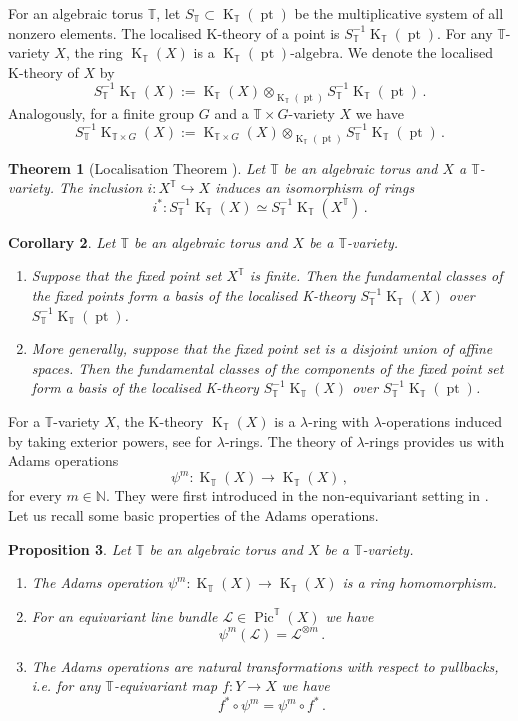 \documentclass[12pt,a4paper]{amsart}
\theoremstyle{plain}
\newtheorem{tw}{Theorem}[section]
\newtheorem{pro}[tw]{Proposition}
\newtheorem{cor}[tw]{Corollary}
\theoremstyle{definition}
\theoremstyle{remark}
\newcommand{\pt}{\operatorname{pt}}
\newcommand{\NN}{\mathbb{N}}
\newcommand{\TT}{\mathbb{T}}
\def\L{\mathcal{L}}
\newcommand{\mono}{\hookrightarrow}
\DeclareMathOperator{\KTh}{K}
\begin{document}
For an algebraic torus $\TT$, let $S_{\TT}\subset \KTh_{\TT}(\pt)$ be the multiplicative system of all nonzero elements. The localised K-theory of a point is $S^{-1}_{\TT}\KTh_{\TT}(\pt)$. For any $\TT$-variety $X$, the ring $\KTh_{\TT}(X)$ is a $\KTh_{\TT}(\pt)$-algebra. We denote the localised K-theory of $X$ by
$$S^{-1}_{\TT}\KTh_{\TT}(X):=\KTh_{\TT}(X)\otimes_{\KTh_{\TT}(\pt)}S^{-1}_{\TT}\KTh_{\TT}(\pt)\,.$$
Analogously, for a finite group $G$ and a $\TT\times G$-variety $X$ we have
$$S^{-1}_{\TT}\KTh_{\TT\times G}(X):=
\KTh_{\TT\times G}(X)\otimes_{\KTh_{\TT}(\pt)}S^{-1}_{\TT}\KTh_{\TT}(\pt)\,.$$
\begin{tw}[Localisation Theorem {\cite[Theorem 2.1]{Tho}}]
	Let $\TT$ be an algebraic torus and $X$ a $\TT$-variety. The inclusion $i:X^\TT\mono X$ induces an isomorphism of rings
	$$i^*:S_{\TT}^{-1}\KTh_\TT(X) \simeq S_{\TT}^{-1}\KTh_\TT(X^\TT)\,.$$
\end{tw}
\begin{cor} \label{cor:fixed}
	Let $\TT$ be an algebraic torus and $X$ be a $\TT$-variety.
	\begin{enumerate}
		\item Suppose that the fixed point set $X^\TT$ is finite. Then the fundamental classes of the fixed points form a basis of the localised K-theory $S_{\TT}^{-1}\KTh_\TT(X)$ over $S_{\TT}^{-1}\KTh_\TT(\pt)$.
		\item More generally, suppose that the fixed point set is a disjoint union of affine spaces. Then the fundamental classes of the components of the fixed point set form a basis of the localised K-theory $S_{\TT}^{-1}\KTh_\TT(X)$ over $S_{\TT}^{-1}\KTh_\TT(\pt)$. 
	\end{enumerate}	
\end{cor}
For a $\TT$-variety $X$, the K-theory $\KTh_\TT(X)$ is a $\lambda$-ring with $\lambda$-operations induced by taking exterior powers, see \cite{lambda1} for  $\lambda$-rings. The theory of $\lambda$-rings provides us with Adams operations
$$
\psi^m: \KTh_{\TT}(X) \to \KTh_{\TT}(X)\,,
$$
for every $m\in \NN$. They were first introduced in the non-equivariant setting in \cite{Adams}.
Let us recall some basic properties of the Adams operations.
\begin{pro}
	Let $\TT$ be an algebraic torus and $X$ be a $\TT$-variety.
	\begin{enumerate}
		\item  The Adams operation $\psi^m: \KTh_{\TT}(X) \to \KTh_{\TT}(X)$ is a ring homomorphism.
		\item  For an equivariant line bundle $\L \in \operatorname{Pic}^\TT(X)$ we have $$\psi^m(\L)=\L^{\otimes m}\,.$$
		\item The Adams operations are natural transformations with respect to pullbacks, i.e. for any $\TT$-equivariant map $f:Y\to X$ we have
		$$f^*\circ \psi^m =\psi^m \circ f^*\,.$$
	\end{enumerate}	  
\end{pro}
\end{document}
